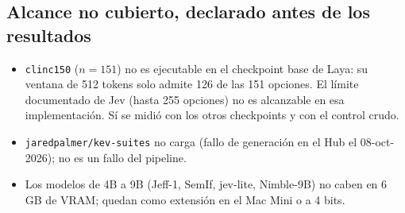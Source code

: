 \subsection{Alcance no cubierto, declarado antes de los resultados}

\begin{itemize}
\item \texttt{clinc150} ($n = 151$) no es ejecutable en el checkpoint base de Laya: su ventana de
  512 tokens solo admite 126 de las 151 opciones. El límite documentado de Jev (hasta 255 opciones) no es
  alcanzable en esa implementación. Sí se midió con los otros checkpoints y con el control crudo.
\item \texttt{jaredpalmer/kev-suites} no carga (fallo de generación en el Hub el 08-oct-2026); no es
  un fallo del pipeline.
\item Los modelos de 4B a 9B (Jeff-1, SemIf, jev-lite, Nimble-9B) no caben en 6 GB de VRAM; quedan como
  extensión en el Mac Mini o a 4 bits.
\end{itemize}
